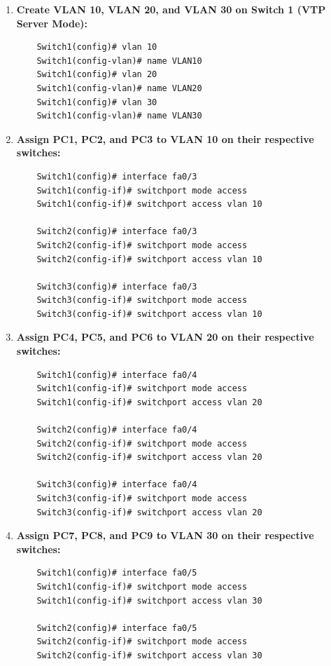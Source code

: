 \documentclass[a4paper]{book}
\begin{document}
\begin{enumerate}
    \item \textbf{Create VLAN 10, VLAN 20, and VLAN 30 on Switch 1 (VTP Server Mode):}
    \begin{lstlisting}
    Switch1(config)# vlan 10
    Switch1(config-vlan)# name VLAN10
    Switch1(config)# vlan 20
    Switch1(config-vlan)# name VLAN20
    Switch1(config)# vlan 30
    Switch1(config-vlan)# name VLAN30
    \end{lstlisting}

    \item \textbf{Assign PC1, PC2, and PC3 to VLAN 10 on their respective switches:}
    \begin{lstlisting}
    Switch1(config)# interface fa0/3
    Switch1(config-if)# switchport mode access
    Switch1(config-if)# switchport access vlan 10

    Switch2(config)# interface fa0/3
    Switch2(config-if)# switchport mode access
    Switch2(config-if)# switchport access vlan 10

    Switch3(config)# interface fa0/3
    Switch3(config-if)# switchport mode access
    Switch3(config-if)# switchport access vlan 10
    \end{lstlisting}

    \item \textbf{Assign PC4, PC5, and PC6 to VLAN 20 on their respective switches:}
    \begin{lstlisting}
    Switch1(config)# interface fa0/4
    Switch1(config-if)# switchport mode access
    Switch1(config-if)# switchport access vlan 20

    Switch2(config)# interface fa0/4
    Switch2(config-if)# switchport mode access
    Switch2(config-if)# switchport access vlan 20

    Switch3(config)# interface fa0/4
    Switch3(config-if)# switchport mode access
    Switch3(config-if)# switchport access vlan 20
    \end{lstlisting}

    \item \textbf{Assign PC7, PC8, and PC9 to VLAN 30 on their respective switches:}
    \begin{lstlisting}
    Switch1(config)# interface fa0/5
    Switch1(config-if)# switchport mode access
    Switch1(config-if)# switchport access vlan 30

    Switch2(config)# interface fa0/5
    Switch2(config-if)# switchport mode access
    Switch2(config-if)# switchport access vlan 30


\end{lstlisting}
\end{enumerate}
\end{document}
